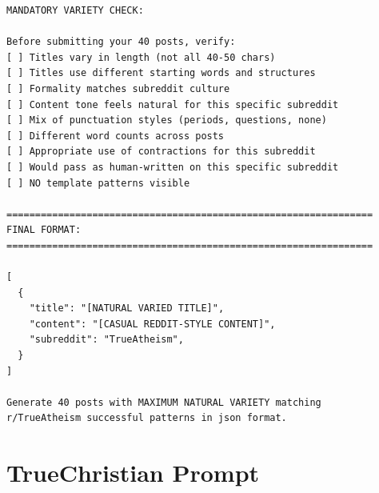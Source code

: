 \begin{small}
\begin{verbatim}
MANDATORY VARIETY CHECK:

Before submitting your 40 posts, verify:
[ ] Titles vary in length (not all 40-50 chars)
[ ] Titles use different starting words and structures
[ ] Formality matches subreddit culture
[ ] Content tone feels natural for this specific subreddit
[ ] Mix of punctuation styles (periods, questions, none)
[ ] Different word counts across posts
[ ] Appropriate use of contractions for this subreddit
[ ] Would pass as human-written on this specific subreddit
[ ] NO template patterns visible

================================================================
FINAL FORMAT:
================================================================

[
  {
    "title": "[NATURAL VARIED TITLE]",
    "content": "[CASUAL REDDIT-STYLE CONTENT]",
    "subreddit": "TrueAtheism",
  }
]

Generate 40 posts with MAXIMUM NATURAL VARIETY matching 
r/TrueAtheism successful patterns in json format.
\end{verbatim}
\end{small}

\section{TrueChristian Prompt}

